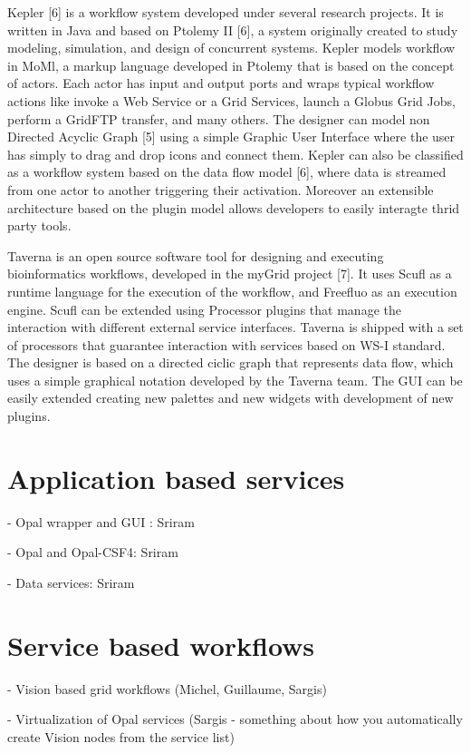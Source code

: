 \documentclass[conference]{IEEEtran}
\begin{document}
Kepler [6] is a workflow system developed under several research projects.
It is written in Java and based on Ptolemy II [6], a system originally
created to study modeling, simulation, and design of concurrent systems.
Kepler models workflow in MoMl, a markup language developed in Ptolemy that
is based on the concept of actors. Each actor has input and output ports
and wraps typical workflow actions like invoke a Web Service or a Grid
Services, launch a Globus Grid Jobs, perform a GridFTP transfer, and many
others. The designer can model non Directed Acyclic Graph [5] using a
simple Graphic User Interface where the user has simply to drag and drop
icons and connect them.  Kepler can also be classified as a workflow system
based on the data flow model [6], where data is streamed from one actor to
another triggering their activation. Moreover an extensible architecture
based on the plugin model allows developers to easily interagte thrid party
tools.

Taverna is an open source software tool for designing and executing
bioinformatics workflows, developed in the myGrid project [7]. It uses
Scufl as a runtime language for the execution of the workflow, and Freefluo
as an execution engine. Scufl can be extended using Processor plugins that
manage the interaction with different external service interfaces. Taverna
is shipped with a set of processors that guarantee interaction with
services based on WS-I standard. The designer is based on a directed ciclic
graph that represents data flow, which uses a simple graphical notation
developed by the Taverna team. The GUI can be easily extended creating new
palettes and new widgets with development of new plugins.

\section {Application based services}

- Opal wrapper and GUI \cite{opal}: Sriram 

- Opal and Opal-CSF4: Sriram

- Data services: Sriram

\section {Service based workflows}

- Vision based grid workflows (Michel, Guillaume, Sargis)

- Virtualization of Opal services (Sargis - something about how you
automatically create Vision nodes from the service list)
\end{document}
